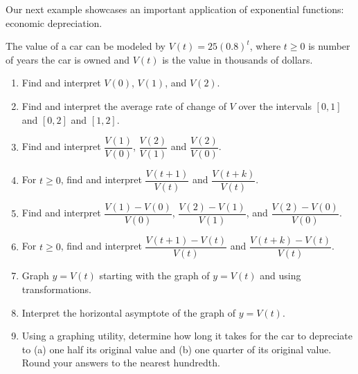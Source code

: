 \documentclass{ximera}
\begin{document}
{\begin{example}
\begin{enumerate}
\end{enumerate}

\end{example}

Our next example showcases an important application of exponential functions:  economic depreciation.

\newpage

\begin{example}  \label{cardepreciationex} The value of a car can be modeled by $V(t) = 25(0.8)^{t}$, where $t \geq 0$ is number of years the car is owned and $V(t)$ is the value in thousands of dollars. 

\begin{enumerate}

\item  Find and interpret $V(0)$, $V(1)$, and $V(2)$.

\item  \label{cararcex} Find and interpret the average rate of change of $V$ over the intervals $[0,1]$ and $[0,2]$ and $[1,2]$.

\item  \label{georatio1} Find and interpret $\dfrac{V(1)}{V(0)}$, $\dfrac{V(2)}{V(1)}$ and $\dfrac{V(2)}{V(0)}$.

\item   \label{georatio2} For $t \geq 0$, find and interpret $\dfrac{V(t+1)}{V(t)}$ and $\dfrac{V(t+k)}{V(t)}$. 

\item  \label{carrelarcex1} Find and interpret $\dfrac{V(1) - V(0)}{V(0)}$, $\dfrac{V(2) - V(1)}{V(1)}$, and $\dfrac{V(2) - V(0)}{V(0)}$.

\item \label{carrelarcex2}  For $t \geq 0$, find and interpret $\dfrac{V(t+1) - V(t)}{V(t)}$ and $\dfrac{V(t+k) - V(t)}{V(t)}$. 

\item  Graph $y=V(t)$ starting with the graph of $y = V(t)$ and using transformations.

\item   Interpret the horizontal asymptote of the graph of $y = V(t)$.

\item  Using a graphing utility, determine how long it takes for the car to depreciate to (a) one half its original value and (b) one quarter of its original value.  Round your answers to the nearest hundredth.

\end{enumerate}


\end{example}}
\end{document}
